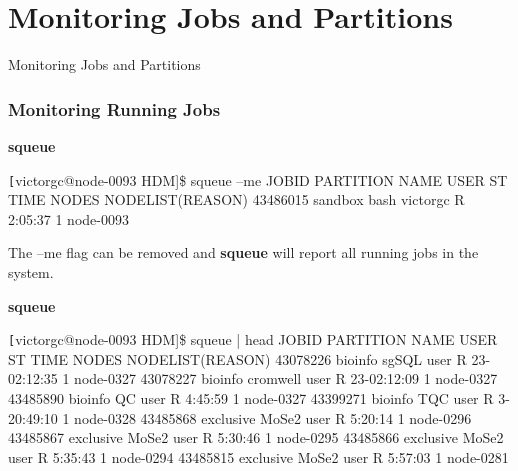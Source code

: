 \section{Monitoring Jobs and Partitions}{Monitoring Jobs and Partitions}
\begin{frame}[fragile]
\frametitle{Monitoring Running Jobs}
\begin{block}{\textbf{squeue}}
\begin{semiverbatim}\tiny \texttt
[victorgc@node-0093 HDM]\$ squeue --me
             JOBID PARTITION     NAME     USER ST       TIME  NODES NODELIST(REASON)
          43486015   sandbox     bash victorgc  R    2:05:37      1 node-0093
\end{semiverbatim}
\end{block}
The --me flag can be removed and \textbf{squeue} will report all running jobs in the system.
\begin{block}{\textbf{squeue}}
\begin{semiverbatim}\tiny \texttt
[victorgc@node-0093 HDM]\$ squeue | head
             JOBID PARTITION     NAME     USER ST       TIME  NODES NODELIST(REASON)
          43078226   bioinfo    sgSQL     user  R 23-02:12:35      1 node-0327
          43078227   bioinfo cromwell     user  R 23-02:12:09      1 node-0327
          43485890   bioinfo       QC     user  R    4:45:59      1 node-0327
          43399271   bioinfo      TQC     user  R 3-20:49:10      1 node-0328
          43485868 exclusive    MoSe2     user  R    5:20:14      1 node-0296
          43485867 exclusive    MoSe2     user  R    5:30:46      1 node-0295
          43485866 exclusive    MoSe2     user  R    5:35:43      1 node-0294
          43485815 exclusive    MoSe2     user  R    5:57:03      1 node-0281
\end{semiverbatim}
\end{block}

\end{frame}

